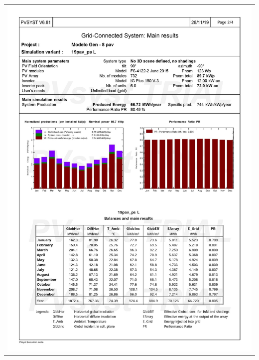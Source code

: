 \begin{table}[H]
    \centering
    \begin{tabular}{l}
        \includegraphics[width=\textwidth]{figures/attachments/resultpv24.jpg}
    \end{tabular}
\end{table}
\pagebreak
